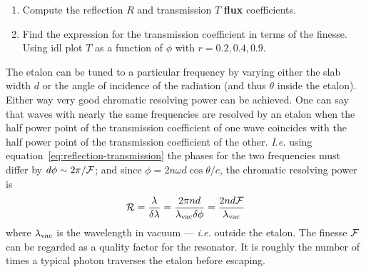 \begin{enumerate}
\setcounter{enumi}{\value{count}}
\item Compute the reflection $R$ and transmission $T$ {\bf flux}
  coefficients. 
\item Find the expression for the transmission coefficient in terms of
  the finesse. Using {\sc idl} plot $T$ as a function of $\phi$ with $r=0.2,0.4,0.9$.
\setcounter{count}{\value{enumi}}
\end{enumerate}

The etalon can be tuned to a particular frequency by varying either the slab width $d$ or the angle of incidence of the radiation (and thus $\theta$ inside the etalon). Either way very good chromatic resolving power can be achieved. One can say that waves with nearly the same frequencies are resolved by an etalon when the half power point of the transmission coefficient of one wave coincides with the half power point of the transmission coefficient of the other. {\it I.e.} using equation~\ref{eq:reflection-transmission} the phases for the two frequencies must differ by $d\phi\sim{2\pi/{\cal F}}$; and since $\phi={2n\omega d\cos\theta/c}$, the chromatic resolving power is 
\[
{\cal R}={\lambda\over\delta\lambda}={2\pi nd\over\lambda_{\rm vac}\delta\phi}
         ={2nd{\cal F}\over\lambda_{\rm vac}}
\]
\noindent
where $\lambda_{\rm vac}$ is the wavelength in vacuum --- {\it i.e.} outside the etalon. The finesse ${\cal F}$ can be regarded as a quality factor for the resonator. It is roughly the number of times a typical photon traverses the etalon before escaping. 
%
